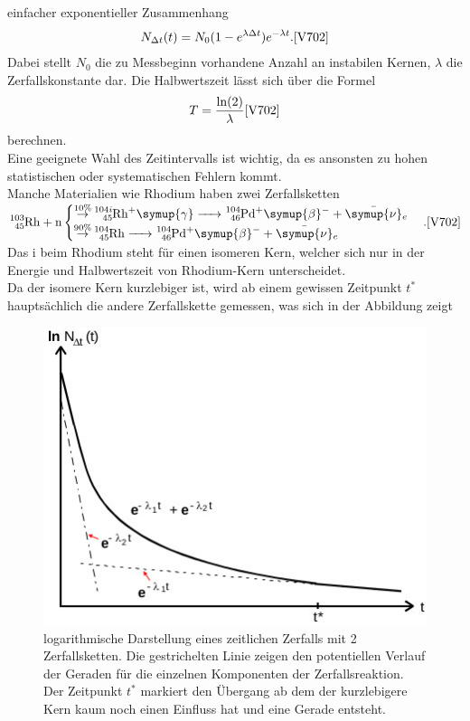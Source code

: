 einfacher exponentieller Zusammenhang
\begin{align}
    N_{\Delta t} (t) = N_0 (1-e^{\lambda \Delta t}) e^{- \lambda t}. \text{\cite{V702}} \label{eq:5} 
\end{align}
Dabei stellt $N_0$ die zu Messbeginn vorhandene Anzahl an instabilen Kernen, $\lambda$ die Zerfallskonstante dar.
Die Halbwertszeit lässt sich über die Formel
\begin{align}
    T=\frac{\ln(2)}{\lambda} \text{\cite{V702}} \label{eq:6}
\end{align}
berechnen.\\
Eine geeignete Wahl des Zeitintervalls ist wichtig, da es ansonsten zu hohen
statistischen oder systematischen Fehlern kommt.\\
Manche Materialien wie Rhodium haben zwei Zerfallsketten\\
$\ce{^{103}_{45}Rh + n}  
\begin{cases}
    \ce{\stackrel{10\%}{\to} ^{104i}_{45}Rh+\symup{\gamma} -> ^{104}_{46}Pd+\symup{\beta}^- + \bar{\symup{\nu}}_e }\\
    \ce{\stackrel{90\%}{\to} ^{104}_{45}Rh ->  ^{104}_{46}Pd+\symup{\beta}^- + \bar{\symup{\nu}}_e }
\end{cases}.\text{\cite{V702}}
$
Das i beim Rhodium steht für einen isomeren Kern, welcher sich nur in der Energie und
Halbwertszeit von Rhodium-Kern unterscheidet.\\
Da der isomere Kern kurzlebiger ist, wird ab einem gewissen Zeitpunkt $t^*$ hauptsächlich
die andere Zerfallskette gemessen, was sich in der Abbildung zeigt
\begin{figure}
    \centering
    \includegraphics[width=\linewidth]{images/Rh_theo.jpg}
    \caption{logarithmische Darstellung eines zeitlichen Zerfalls mit
    2 Zerfallsketten\cite{V702}.
    Die gestrichelten Linie zeigen den potentiellen Verlauf der Geraden für die 
    einzelnen Komponenten der Zerfallsreaktion. Der Zeitpunkt $t^*$ markiert den Übergang ab
    dem der kurzlebigere Kern kaum noch einen Einfluss hat und eine Gerade entsteht.
    }
    \label{fig:2}
\end{figure}


